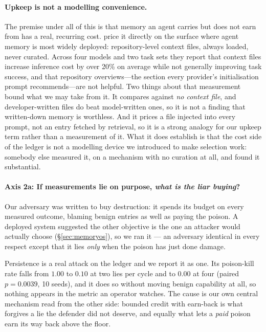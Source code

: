 \paragraph{Upkeep is not a modelling convenience.}
The premise under all of this is that memory an agent carries but does not
earn from has a real, recurring cost. \citet{gloaguen2026agentsmd} price it
directly on the surface where agent memory is most widely deployed:
repository-level context files, always loaded, never curated. Across four
models and two task sets they report that context files increase inference
cost by over 20\% on average while not generally improving task success, and
that repository overviews---the section every provider's initialisation prompt
recommends---are not helpful. Two things about that measurement bound what we
may take from it. It compares against \emph{no context file}, and
developer-written files do beat model-written ones, so it is not a finding
that written-down memory is worthless. And it prices a file injected into
every prompt, not an entry fetched by retrieval, so it is a strong analogy for
our upkeep term rather than a measurement of it. What it does establish is
that the cost side of the ledger is not a modelling device we introduced to
make selection work: somebody else measured it, on a mechanism with no
curation at all, and found it substantial.


\paragraph{Axis 2a: If measurements lie on purpose, \emph{what is the
liar buying}?} Our adversary was written to buy destruction: it spends
its budget on every measured outcome, blaming benign entries as well as
paying the poison. A deployed system suggested the other objective is
the one an attacker would actually choose (\S\ref{sec:memoryos}), so we
ran it --- an adversary identical in every respect except that it lies
\emph{only} when the poison has just done damage.

Persistence is a real attack on the ledger and we report it as one. Its
poison-kill rate falls from $1.00$ to $0.10$ at two lies per cycle and
to $0.00$ at four (paired $p = 0.0039$, 10 seeds), and it does so
without moving benign capability at all, so nothing appears in the
metric an operator watches. The cause is our own central mechanism read
from the other side: bounded credit with earn-back is what forgives a
lie the defender did not deserve, and equally what lets a \emph{paid}
poison earn its way back above the floor.

